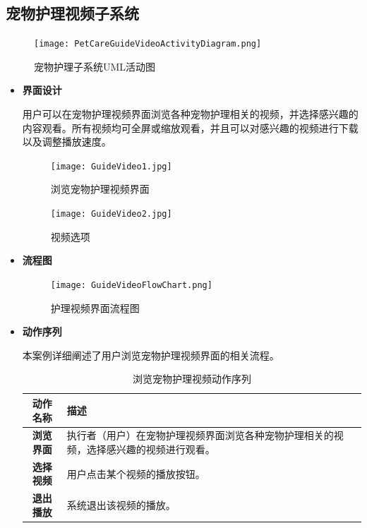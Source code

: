 \subsection{宠物护理视频子系统}

\begin{figure}[H]
	\centering
	\texttt{[image: PetCareGuideVideoActivityDiagram.png]} 
	\caption{宠物护理子系统UML活动图}
\end{figure}

\begin{itemize}
	
	\item \textbf{界面设计}
	
	用户可以在宠物护理视频界面浏览各种宠物护理相关的视频，并选择感兴趣的内容观看。所有视频均可全屏或缩放观看，并且可以对感兴趣的视频进行下载以及调整播放速度。
	
	\begin{figure}[H]
		\centering
		\texttt{[image: GuideVideo1.jpg]}
		\caption{浏览宠物护理视频界面}
	\end{figure}
	
	\begin{figure}[H]
		\centering
		\texttt{[image: GuideVideo2.jpg]}
		\caption{视频选项}
	\end{figure}
	
	\item \textbf{流程图}
	
	\begin{figure}[H]
		\centering
		\texttt{[image: GuideVideoFlowChart.png]}
		\caption{护理视频界面流程图}
	\end{figure}
	
	\item \textbf{动作序列}
	
	本案例详细阐述了用户浏览宠物护理视频界面的相关流程。
	
	\begin{table}[H]
		\centering
		\caption{浏览宠物护理视频动作序列}
		\renewcommand\arraystretch{1.5}
		\begin{tabular}{|c|>{\raggedright\arraybackslash}p{10cm}|}
			\hline
			\textbf{动作名称} & \textbf{描述} \\ \hline
			\textbf{浏览界面} & 执行者（用户）在宠物护理视频界面浏览各种宠物护理相关的视频，选择感兴趣的视频进行观看。 \\ \hline
			\textbf{选择视频} & 用户点击某个视频的播放按钮。\\ \hline
			\textbf{退出播放} & 系统退出该视频的播放。\\ \hline
		\end{tabular}
	\end{table}
	

\end{itemize}
